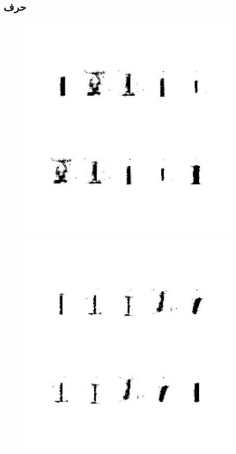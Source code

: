 \documentclass{article}
\begin{document}
\subsection{حرف }
\begin{figure}[H]
	\centerline{\includegraphics[width=\textwidth , height=\textheight ]{../results/CGAN_Adam/figs/letters/I/95.pdf}}
\end{figure}
\begin{figure}[H]
	\centerline{\includegraphics[width=\textwidth , height=\textheight ]{../results/CGAN_Adam/figs/letters/I/90.pdf}}
\end{figure}
\end{document}
